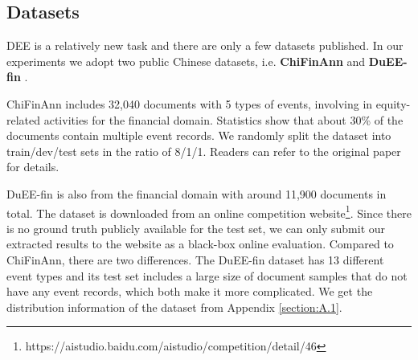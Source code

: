 \documentclass[11pt]{article}
\begin{document}
\begin{table}
\centering\small
{}
\caption{Comparison of event extraction between baselines and our ReDEE model on the DuEE-fin dataset. : results from  \cite{PTPCG}.}
\label{tab:dueefin1}
\end{table}

\subsection{Datasets}

DEE is a relatively new task and there are only a few datasets published. In our experiments we adopt two public Chinese datasets, i.e. \textbf{ChiFinAnn} \cite{Doc2EDAG} and \textbf{DuEE-fin} \cite{DuEE-fin}. 

ChiFinAnn includes 32,040 documents with 5 types of events, involving in equity-related activities for the financial domain. Statistics show that about 30\% of the documents contain multiple event records. We randomly split the dataset into train/dev/test sets in the ratio of 8/1/1. Readers can refer to the original paper for details.

DuEE-fin is also from the financial domain with around 11,900 documents in total. The dataset is downloaded from an online competition website\footnote{https://aistudio.baidu.com/aistudio/competition/detail/46}. Since there is no ground truth publicly available for the test set, we can only submit our extracted results to the website as a black-box online evaluation. Compared to ChiFinAnn, there are two differences. The DuEE-fin dataset has 13 different event types and its test set includes a large size of document samples that do not have any event records, which both make it more complicated. We get the distribution information of the dataset from Appendix \ref{section:A.1}.
\end{document}
